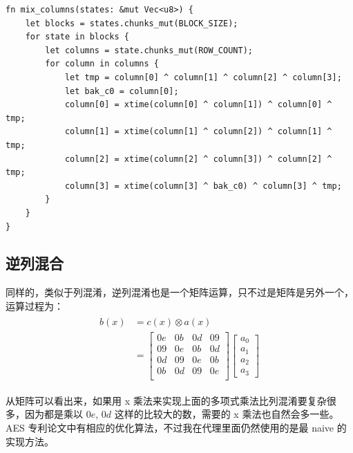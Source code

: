 \documentclass[degree=project,degree-type=project,cjk-font=noto]{thuthesis}
\begin{document}
  \begin{verbatim}
fn mix_columns(states: &mut Vec<u8>) {
    let blocks = states.chunks_mut(BLOCK_SIZE);
    for state in blocks {
        let columns = state.chunks_mut(ROW_COUNT);
        for column in columns {
            let tmp = column[0] ^ column[1] ^ column[2] ^ column[3];
            let bak_c0 = column[0];
            column[0] = xtime(column[0] ^ column[1]) ^ column[0] ^ tmp;
            column[1] = xtime(column[1] ^ column[2]) ^ column[1] ^ tmp;
            column[2] = xtime(column[2] ^ column[3]) ^ column[2] ^ tmp;
            column[3] = xtime(column[3] ^ bak_c0) ^ column[3] ^ tmp;
        }
    }
}
  \end{verbatim}


\subsection{逆列混合}

同样的，类似于列混淆，逆列混淆也是一个矩阵运算，只不过是矩阵是另外一个，运算过程为：
\begin{align}
  \begin{split}
    b(x) &= c(x) \otimes a(x) \\
    &= \begin{bmatrix}
0e & 0b & 0d & 09 \\
09 & 0e & 0b & 0d \\
0d & 09 & 0e & 0b \\
0b & 0d & 09 & 0e \\
    \end{bmatrix} \begin{bmatrix}
      a_0 \\
      a_1 \\
      a_2 \\
      a_3
    \end{bmatrix}
  \end{split}
\end{align}

从矩阵可以看出来，如果用 x 乘法来实现上面的多项式乘法比列混淆要复杂很多，因为都是乘以 $0e$, $0d$ 这样的比较大的数，需要的 x 乘法也自然会多一些。
AES 专利论文中有相应的优化算法，不过我在代理里面仍然使用的是最 naive 的实现方法。
\end{document}
